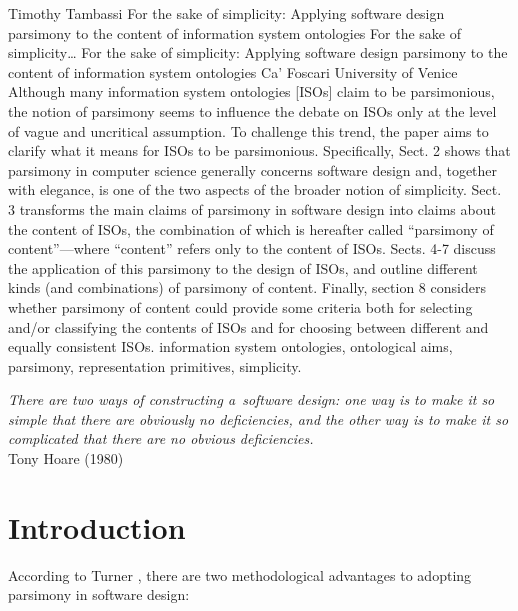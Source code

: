 \begin{artengenv}{Timothy Tambassi}
	{For the sake of simplicity: Applying software design parsimony to the content of information system ontologies}
	{For the sake of simplicity\ldots}
	{For the sake of simplicity: Applying software design parsimony to the content of information system ontologies}
	{Ca' Foscari University of Venice}
	{Although many information system ontologies [ISOs] claim to be parsimonious, the notion of parsimony\textcolor{red}{ }seems to influence the debate on ISOs only at the level of vague and uncritical assumption. To challenge this trend, the paper aims to clarify what it means for ISOs to be parsimonious. Specifically, Sect. 2 shows that parsimony in computer science generally concerns software design and, together with elegance, is one of the two aspects of the broader notion of simplicity. Sect. 3 transforms the main claims of parsimony in software design into claims about the content of ISOs, the combination of which is hereafter called ``parsimony of content''---where ``content'' refers only to the content of ISOs. Sects. 4-7 discuss the application of this parsimony to the design of ISOs, and outline different kinds (and combinations) of parsimony of content. Finally, section 8 considers whether parsimony of content could provide some criteria both for selecting and/or classifying the contents of ISOs and for choosing between different and equally consistent ISOs.
	}
	{information system ontologies, ontological aims, parsimony, representation primitives, simplicity.}

\begin{customepigraph}
\textit{There are two ways of constructing a~software design:
one way is to make it so simple that there are obviously no deficiencies,
and the other way is to make it so complicated that there are no obvious deficiencies.
} \\
Tony Hoare (1980)
\end{customepigraph}



\section{Introduction}

According to Turner 
\parencite*[][]{turner_computational_2018}, %
 there are two methodological advantages to adopting parsimony in software design:




\end{artengenv}
